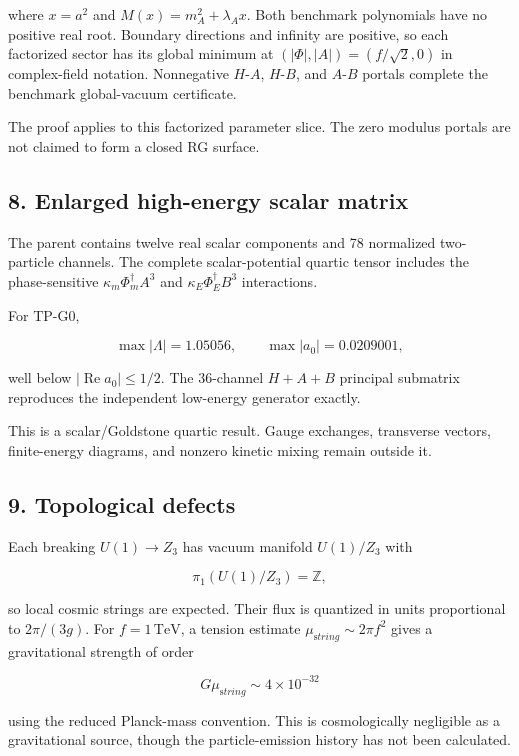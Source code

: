 \documentclass[
]{article}
\begin{document}
where \(x=a^2\) and \(M(x)=m_A^2+\lambda_Ax\). Both benchmark
polynomials have no positive real root. Boundary directions and infinity
are positive, so each factorized sector has its global minimum at
\((|\Phi|,|A|)=(f/\sqrt2,0)\) in complex-field notation. Nonnegative
\(H\)-\(A\), \(H\)-\(B\), and \(A\)-\(B\) portals complete the benchmark
global-vacuum certificate.

The proof applies to this factorized parameter slice. The zero modulus
portals are not claimed to form a closed RG surface.

\hypertarget{enlarged-high-energy-scalar-matrix}{%
\subsection{8. Enlarged high-energy scalar
matrix}\label{enlarged-high-energy-scalar-matrix}}

The parent contains twelve real scalar components and 78 normalized
two-particle channels. The complete scalar-potential quartic tensor
includes the phase-sensitive \(\kappa_m\Phi_m^\dagger A^3\) and
\(\kappa_E\Phi_E^\dagger B^3\) interactions.

For TP-G0,

\[
\max|\Lambda|=1.05056,
\qquad
\max|a_0|=0.0209001,
\]

well below \(|\operatorname{Re}a_0|\le1/2\). The 36-channel \(H+A+B\)
principal submatrix reproduces the independent low-energy generator
exactly.

This is a scalar/Goldstone quartic result. Gauge exchanges, transverse
vectors, finite-energy diagrams, and nonzero kinetic mixing remain
outside it.

\hypertarget{topological-defects}{%
\subsection{9. Topological defects}\label{topological-defects}}

Each breaking \(U(1)\to Z_3\) has vacuum manifold \(U(1)/Z_3\) with

\[
\pi_1(U(1)/Z_3)=\mathbb Z,
\]

so local cosmic strings are expected. Their flux is quantized in units
proportional to \(2\pi/(3g)\). For \(f=1\,\mathrm{TeV}\), a tension
estimate \(\mu_{\mathrm string}\sim2\pi f^2\) gives a gravitational
strength of order

\[
G\mu_{\mathrm string}\sim4\times10^{-32}
\]

using the reduced Planck-mass convention. This is cosmologically
negligible as a gravitational source, though the particle-emission
history has not been calculated.
\end{document}
